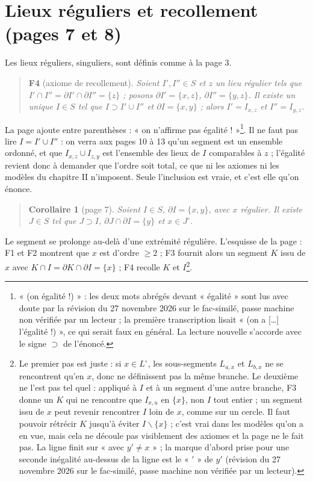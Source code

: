 \documentclass[11pt,a4paper]{article}
\begin{document}
\section*{Lieux réguliers et recollement (pages 7 et 8)}

Les lieux réguliers, singuliers, sont définis comme à la page 3.

\begin{quote}
\textbf{F4} (axiome de recollement). \emph{Soient $I', I'' \in S$ et $z$ un
lieu \emph{régulier} tels que $I' \cap I'' = \partial I' \cap \partial I'' =
\{z\}$ ; posons $\partial I' = \{x,z\}$, $\partial I'' = \{y,z\}$. Il existe
un unique $I \in S$ tel que $I \supset I' \cup I''$ et $\partial I =
\{x,y\}$ ; alors $I' = I_{x,z}$ et $I'' = I_{y,z}$.}
\end{quote}

La page ajoute entre parenthèses : « on n'affirme pas égalité
! »\footnote{« (on  égalité !) » : les deux mots
abrégés devant « égalité » sont lus avec doute par la révision du 27 novembre
2026 sur le fac-similé, passe machine non vérifiée par un lecteur ; la
première transcription lisait « (on a [\dots] l'égalité !) », ce qui serait
faux en général. La lecture nouvelle s'accorde avec le signe $\supset$ de
l'énoncé.}. Il ne faut pas lire $I = I' \cup I''$ :
on verra aux pages 10 à 13 qu'un segment est un ensemble ordonné, et que
$I_{x,z} \cup I_{z,y}$ est l'ensemble des lieux de $I$ comparables à $z$ ;
l'égalité revient donc à demander que l'ordre soit total, ce que ni les
axiomes ni les modèles du chapitre II n'imposent. Seule l'inclusion est vraie,
et c'est elle qu'on énonce.

\begin{quote}
\textbf{Corollaire 1} (page 7). \emph{Soient $I \in S$, $\partial I =
\{x,y\}$, avec $x$ régulier. Il existe $J \in S$ tel que $J \supset I$,
$\partial J \cap \partial I = \{y\}$ et $x \in J^{\circ}$.}
\end{quote}

Le segment se prolonge au-delà d'une extrémité régulière. L'esquisse de la
page : F1 et F2 montrent que $x$ est d'ordre $\geq 2$ ; F3 fournit alors un
segment $K$ issu de $x$ avec $K \cap I = \partial K \cap \partial I = \{x\}$ ;
F4 recolle $K$ et $I$\footnote{Le premier pas est juste : si $x \in
L^{\circ}$, les sous-segments $L_{a,x}$ et $L_{b,x}$ ne se rencontrent qu'en
$x$, donc ne définissent pas la même branche. Le deuxième ne l'est pas tel
quel : appliqué à $I$ et à un segment d'une autre branche, F3 donne un $K$ qui
ne rencontre que $I_{x,u}$ en $\{x\}$, non $I$ tout entier ; un segment issu
de $x$ peut revenir rencontrer $I$ loin de $x$, comme sur un cercle. Il faut
pouvoir rétrécir $K$ jusqu'à éviter $I \smallsetminus \{x\}$ ; c'est vrai dans
les modèles qu'on a en vue, mais cela ne découle pas visiblement des axiomes
et la page ne le fait pas. La ligne finit sur « avec $y' \neq x$ » ; la marque
d'abord prise pour une seconde inégalité au-dessus de la ligne est le « $'$ »
de $y'$ (révision du 27 novembre 2026 sur le fac-similé, passe machine non
vérifiée par un lecteur).}.
\end{document}
